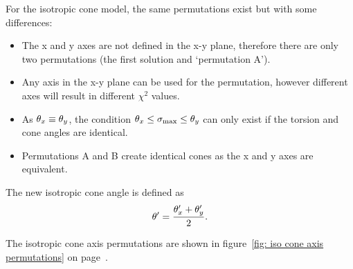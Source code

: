 For the isotropic cone model, the same permutations exist but with some differences:
\begin{itemize}
    \item The x and y axes are not defined in the x-y plane, therefore there are only two permutations (the first solution and `permutation A').
    \item Any axis in the x-y plane can be used for the permutation, however different axes will result in different $\chi^2$ values.
    \item As $\theta_x \equiv \theta_y$, the condition $\theta_x \le \sigma_\textrm{max} \le \theta_y$ can only exist if the torsion and cone angles are identical.
    \item Permutations A and B create identical cones as the x and y axes are equivalent.
\end{itemize}

The new isotropic cone angle is defined as
\begin{equation}
    \theta' = \frac{\theta_x' + \theta_y'}{2}.
\end{equation}

The isotropic cone axis permutations are shown in figure~\ref{fig: iso cone axis permutations} on page~\pageref{fig: iso cone axis permutations}.

